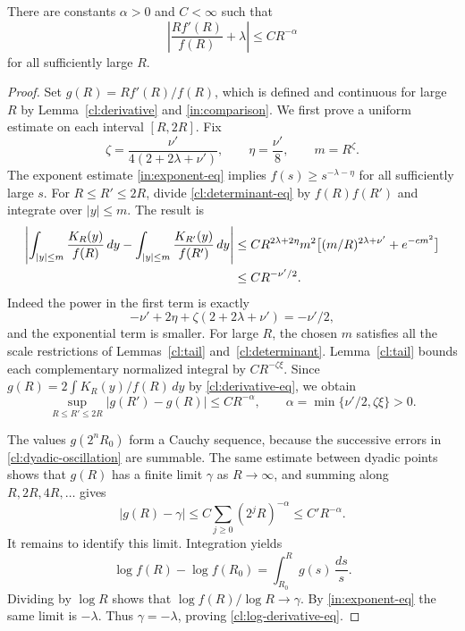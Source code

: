 \begin{proposition}\label{cl:log-derivative}
There are constants $\alpha>0$ and $C<\infty$ such that
\begin{equation}\label{cl:log-derivative-eq}
 \left|\frac{Rf'(R)}{f(R)}+\lambda\right|
 \le CR^{-\alpha}
\end{equation}
for all sufficiently large $R$.
\end{proposition}

\begin{proof}
Set $g(R)=Rf'(R)/f(R)$, which is defined and continuous for
large $R$ by Lemma~\ref{cl:derivative} and
\eqref{in:comparison}. We first prove a uniform estimate on
each interval $[R,2R]$. Fix
\[
 \zeta=\frac{\nu'}{4(2+2\lambda+\nu')},\qquad
 \eta=\frac{\nu'}8,\qquad m=R^\zeta.
\]
The exponent estimate \eqref{in:exponent-eq} implies
$f(s)\ge s^{-\lambda-\eta}$ for all sufficiently large $s$.
For $R\le R'\le2R$, divide \eqref{cl:determinant-eq} by
$f(R)f(R')$ and integrate over $|y|\le m$. The result is
\begin{align}
 \left|\int_{|y|\le m}\frac{K_R(y)}{f(R)}\,dy
       -\int_{|y|\le m}\frac{K_{R'}(y)}{f(R')}\,dy\right|
 &\le C R^{2\lambda+2\eta}m^2
          \bigl[(m/R)^{2\lambda+\nu'}+e^{-cm^2}\bigr]\notag\\
 &\le C R^{-\nu'/2}.
 \label{cl:normalized-near}
\end{align}
Indeed the power in the first term is exactly
\[
 -\nu'+2\eta+\zeta(2+2\lambda+\nu')=-\nu'/2,
\]
and the exponential term is smaller. For large $R$, the chosen
$m$ satisfies all the scale restrictions of
Lemmas~\ref{cl:tail} and~\ref{cl:determinant}.
Lemma~\ref{cl:tail} bounds each complementary normalized integral
by $C R^{-\zeta\xi}$. Since
$g(R)=2\int K_R(y)/f(R)\,dy$ by
\eqref{cl:derivative-eq}, we obtain
\begin{equation}\label{cl:dyadic-oscillation}
 \sup_{R\le R'\le2R}|g(R')-g(R)|\le CR^{-\alpha},
 \qquad
 \alpha=\min\{\nu'/2,\zeta\xi\}>0.
\end{equation}

The values $g(2^nR_0)$ form a Cauchy sequence, because the
successive errors in \eqref{cl:dyadic-oscillation} are summable.
The same estimate between dyadic points shows that $g(R)$ has
a finite limit $\gamma$ as $R\to\infty$, and summing along
$R,2R,4R,\ldots$ gives
\[
 |g(R)-\gamma|\le C\sum_{j\ge0}(2^jR)^{-\alpha}
 \le C'R^{-\alpha}.
\]
It remains to identify this limit. Integration yields
\[
 \log f(R)-\log f(R_0)=\int_{R_0}^R g(s)\,\frac{ds}s.
\]
Dividing by $\log R$ shows that
$\log f(R)/\log R\to\gamma$. By \eqref{in:exponent-eq} the
same limit is $-\lambda$. Thus $\gamma=-\lambda$, proving
\eqref{cl:log-derivative-eq}.
\end{proof}

